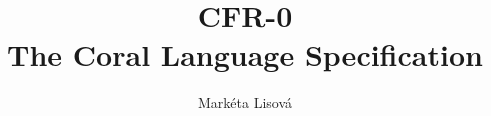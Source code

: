 \documentclass[12pt,a4paper,twoside,titlepage]{book}
\begin{document}
\frontmatter
\title{CFR-0\\ \large The Coral Language Specification}
\renewcommand{\docversion}{0.1}
\author{Markéta Lisová}
\maketitle
\clearemptydoublepage
\tableofcontents

\mainmatter
\sloppy



\appendix

\end{document}
